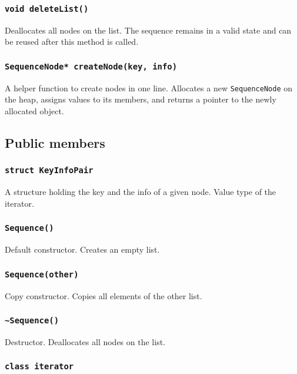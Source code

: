 ﻿\documentclass{article}
\begin{document}
\subsubsection{{\tt void deleteList()}}

Deallocates all nodes on the list. The sequence remains in a valid state and can be
reused after this method is called.

\subsubsection{{\tt SequenceNode* createNode(key, info)}}

A helper function to create nodes in one line. Allocates a new {\tt SequenceNode} on the heap,
assigns values to its members, and returns a pointer to the newly allocated object.

\subsection{Public members}

\subsubsection{{\tt struct KeyInfoPair}}

A structure holding the key and the info of a given node. Value type of the iterator.

\subsubsection{{\tt Sequence()}}

Default constructor. Creates an empty list.

\subsubsection{{\tt Sequence(other)}}

Copy constructor. Copies all elements of the other list.

\subsubsection{{\tt \~{}Sequence()}}

Destructor. Deallocates all nodes on the list.

\subsubsection{{\tt class iterator}}
\end{document}
